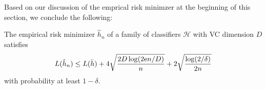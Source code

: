 Based on our discussion of the emprical risk minimzer at the beginning of this section, we conclude the following:

\begin{corollary}
The empirical risk minimizer $\hat h_n$ of a family of classifiers $\mathcal{H}$ with VC dimension $D$ satisfies
\[
    L(\hat h_n) \leq L(\bar h) + 4 \sqrt{\frac{2D \log(2 \mathrm{e} n / D)}{n}} + 2 \sqrt{\frac{\log(2 / \delta)}{2n}}
\]
with probability at least $1 - \delta$.
\end{corollary}
